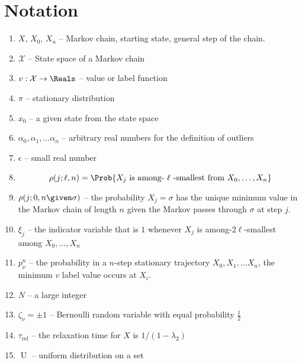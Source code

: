 \documentclass[12pt]{article}
\begin{document}
\section*{Notation}
\begin{enumerate}
    \item
        \( X \), \( X_0 \), \( X_n \) -- Markov chain, starting state,
        general step of the chain.
    \item
        \( \mathcal{X} \) -- State space of a Markov chain
    \item
        \( v :  \mathcal{X} \to \Reals \) -- value or label function
    \item
        \( \pi \) -- stationary distribution
    \item
        \( x_0 \) -- a given state from the state space
    \item
        \( \alpha_0, \alpha_1, \dots \alpha_n \) -- arbitrary real
        numbers for the definition of outliers
    \item
        \( \epsilon \) -- small real number
    \item
        \[
            \rho(j; \ell, n) = \Prob{X_j \text{ is among- \( \ell \)
            -smallest from } X_0, \dots, X_n }
        \]
    \item
        \( \rho(j; 0, n \given \sigma) \) -- the probability \( X_j =
        \sigma \) has the unique minimum value in the Markov chain of
        length \( n \) given the Markov passes through \( \sigma \) at
        step \( j \).
    \item
        \( \xi_j \) -- the indicator variable that is \( 1 \) whenever \(
        X_j \) is among-\( 2\ell \)-smallest among \( X_0, \dots , X_n \)
    \item
        \( p_{\nu}^n \) -- the probability in a \( n \)-step stationary
        trajectory \( X_0, X_1, \dots X_n \), the minimum \( v \) label
        value occurs at \( X_i \).
    \item
        \( N \) -- a large integer
    \item
        \( \zeta_{\nu} = \pm 1 \) -- Bernoulli random variable with
        equal probability \( \frac{1}{2} \)
    \item
        \( \tau_{\text{rel}} \) -- the relaxation time for \( X \) is \(
        1/ (1-\lambda_2) \)
    \item
        \(
        \operatorname{U}
        \) -- uniform distribution on a set
\end{enumerate}
\end{document}
